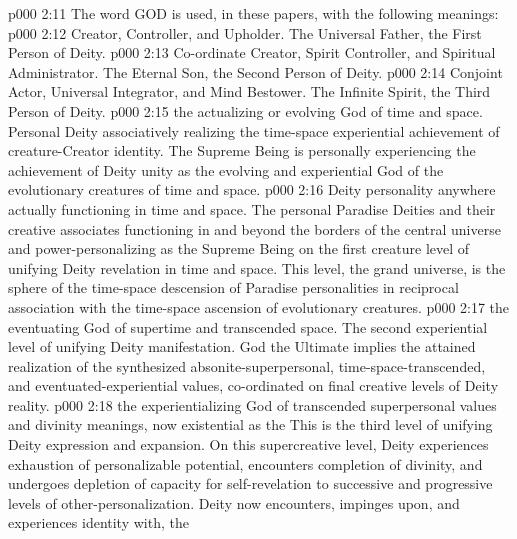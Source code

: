 \vs p000 2:11 \pc The word GOD is used, in these papers, with the following meanings:
\vs p000 2:12 \bibnobreakspace {} Creator, Controller, and Upholder. The Universal Father, the First Person of Deity.
\vs p000 2:13 \bibnobreakspace {} Co\hyp{}ordinate Creator, Spirit Controller, and Spiritual Administrator. The Eternal Son, the Second Person of Deity.
\vs p000 2:14 \bibnobreakspace {} Conjoint Actor, Universal Integrator, and Mind Bestower. The Infinite Spirit, the Third Person of Deity.
\vs p000 2:15 \bibnobreakspace {} the actualizing or evolving God of time and space. Personal Deity associatively realizing the time\hyp{}space experiential achievement of creature\hyp{}Creator identity. The Supreme Being is personally experiencing the achievement of Deity unity as the evolving and experiential God of the evolutionary creatures of time and space.
\vs p000 2:16 \bibnobreakspace {} Deity personality anywhere actually functioning in time and space. The personal Paradise Deities and their creative associates functioning in and beyond the borders of the central universe and power\hyp{}personalizing as the Supreme Being on the first creature level of unifying Deity revelation in time and space. This level, the grand universe, is the sphere of the time\hyp{}space descension of Paradise personalities in reciprocal association with the time\hyp{}space ascension of evolutionary creatures.
\vs p000 2:17 \bibnobreakspace {} the eventuating God of supertime and transcended space. The second experiential level of unifying Deity manifestation. God the Ultimate implies the attained realization of the synthesized absonite\hyp{}superpersonal, time\hyp{}space\hyp{}transcended, and eventuated\hyp{}experiential values, co\hyp{}ordinated on final creative levels of Deity reality.
\vs p000 2:18 \bibnobreakspace {} the experientializing God of transcended superpersonal values and divinity meanings, now existential as the  This is the third level of unifying Deity expression and expansion. On this supercreative level, Deity experiences exhaustion of personalizable potential, encounters completion of divinity, and undergoes depletion of capacity for self\hyp{}revelation to successive and progressive levels of other\hyp{}personalization. Deity now encounters, impinges upon, and experiences identity with, the 
